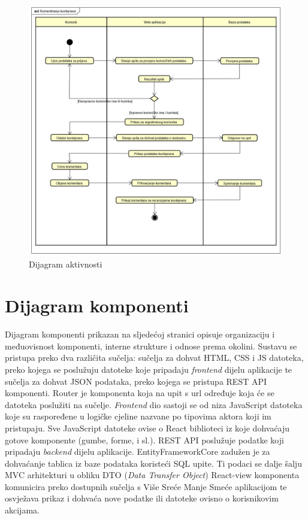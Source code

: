 			\begin{figure}[H]
				\includegraphics[width=1.0\linewidth]{slike/dijagramAktivnosti.png}
				\centering
				\caption{Dijagram aktivnosti}
				\label{fig:dijagramAktivnosti}
			\end{figure}
			
			\eject
		\section{Dijagram komponenti}
		
			Dijagram komponenti prikazan na sljedećoj stranici opisuje organizaciju i međuovisnost komponenti, interne strukture i odnose prema okolini. Sustavu se pristupa preko dva različita sučelja: sučelja za dohvat HTML, CSS i JS datoteka, preko kojega se poslužuju datoteke koje pripadaju \textit{frontend} dijelu aplikacije te sučelja za dohvat JSON podataka, preko kojega se pristupa REST API komponenti. Router je komponenta koja na upit s url određuje koja će se datoteka poslužiti na sučelje. \textit{Frontend} dio sastoji se od niza JavaScript datoteka koje su raspoređene u logičke cjeline nazvane po tipovima aktora koji im pristupaju. Sve JavaScript datoteke ovise o React biblioteci iz koje dohvaćaju gotove komponente (gumbe, forme, i sl.). REST API poslužuje podatke koji pripadaju \textit{backend} dijelu aplikacije. EntityFrameworkCore zadužen je za dohvaćanje tablica iz baze podataka koristeći SQL upite. Ti podaci se dalje šalju MVC arhitekturi u obliku DTO (\textit{Data Transfer Object}) React-view komponenta komunicira preko dostupnih sučelja s Više Sreće Manje Smeće aplikacijom te osvježava prikaz i dohvaća nove podatke ili datoteke ovisno o korisnikovim akcijama.


